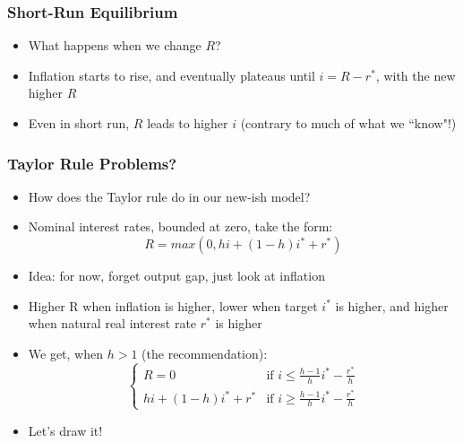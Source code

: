 \documentclass{beamer}
\begin{document}
\begin{frame}
\frametitle[alignment=center]{Short-Run Equilibrium}
\begin{itemize}
\item What happens when we change $R$?
\bigskip
\item Inflation starts to rise, and eventually plateaus until $i=R-r^*$, with the new higher $R$
\bigskip
\item Even in short run, $R$ leads to higher $i$ (contrary to much of what we ``know"!)
\end{itemize}
\end{frame}


\begin{frame}
\frametitle[alignment=center]{Taylor Rule Problems?}
\begin{itemize}
\item How does the Taylor rule do in our new-ish model?
\bigskip
\item Nominal interest rates, bounded at zero, take the form:
$$R=max\left(0,hi+(1-h)i^*+r^*\right)$$
\item Idea:  for now, forget output gap, just look at inflation
\bigskip
\item Higher R when inflation is higher, lower when target $i^*$ is higher, and higher when natural real interest rate $r^*$ is higher
\bigskip
\item We get, when $h>1$ (the recommendation):
$$\begin{cases} R=0 & \text{if }i\leq\frac{h-1}{h}i^*-\frac{r^*}{h} \\ hi+(1-h)i^*+r^* & \text{if }i\geq\frac{h-1}{h}i^*-\frac{r^*}{h}\end{cases}$$
\item Let's draw it!
\end{itemize}
\end{frame}
\end{document}
